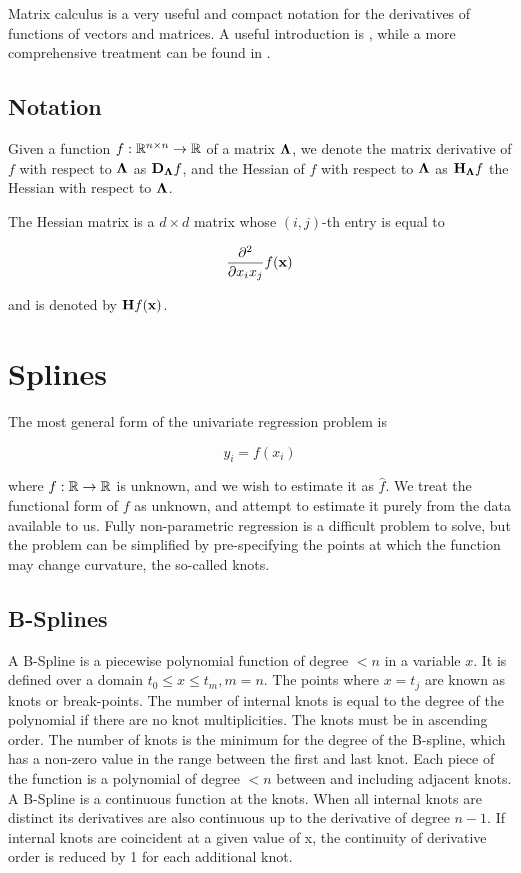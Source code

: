 \documentclass{amsart}[12pt]
\begin{document}
Matrix calculus is a very useful and compact notation for the derivatives of functions of vectors and matrices.
A useful introduction is \cite{wand02}, while a more comprehensive treatment can be found in
\cite{MagnusNeudecker99}.

\subsection{Notation}

Given a function $f:{\mathbb{R}}^{n \times n} \to {\mathbb{R}}$ of a matrix ${\boldsymbol \Lambda}$, we denote the matrix derivative of $f$ with 
respect to ${\boldsymbol \Lambda}$ as ${\bf D}_{\boldsymbol \Lambda} f$, and the Hessian of $f$ with respect to ${\boldsymbol \Lambda}$ as
${\bf H}_{\boldsymbol \Lambda} f$ the Hessian with respect to ${\boldsymbol \Lambda}$.

The Hessian matrix is a $d \times d$ matrix whose $(i, j)$-th entry is equal to

$$
\frac{\partial^2}{\partial x_i x_j} f({\bf x})
$$

and is denoted by ${\bf H} f({\bf x})$.

\section{Splines}
The most general form of the univariate regression problem is

$$
y_i = f(x_i)
$$

where $f: {\mathbb{R}} \to {\mathbb{R}}$ is unknown, and we wish to estimate it as $\hat{f}$. We treat the functional form of
$f$ as unknown, and attempt to estimate it purely from the data available to us. Fully non-parametric regression
is a difficult problem to solve, but the problem can be simplified by pre-specifying the points at which the
function may change curvature, the so-called knots.

\subsection{B-Splines}
A B-Spline is a piecewise polynomial function of degree $< n$ in a variable $x$. It is defined over a
domain $t_0 \leq x \leq t_m, m=n$. The points where $x = t_j$ are known as knots or break-points. The
number of internal knots is equal to the degree of the polynomial if there are no knot multiplicities.
The knots must be in ascending order. The number of knots is the minimum for the degree of the B-spline,
which has a non-zero value in the range between the first and last knot. Each piece of the function is a
polynomial of degree $< n$ between and including adjacent knots. A B-Spline is a continuous function at the
knots. When all internal knots are distinct its derivatives are also continuous up to the derivative of degree
$n - 1$. If internal knots are coincident at a given value of x, the continuity of derivative order is reduced
by 1 for each additional knot.
\end{document}
